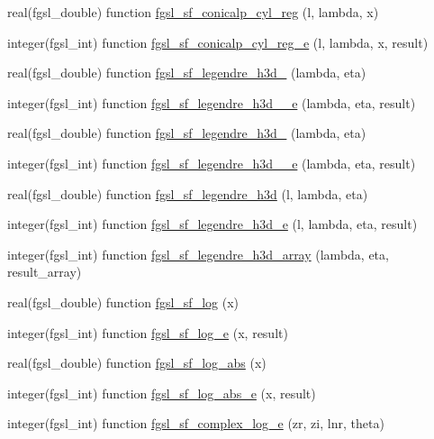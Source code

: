 \begin{DoxyCompactItemize}
real(fgsl\+\_\+double) function \hyperlink{specfunc_8finc_ac8ee55b9021c5e2c23b744765bddb373}{fgsl\+\_\+sf\+\_\+conicalp\+\_\+cyl\+\_\+reg} (l, lambda, x)
\item 
integer(fgsl\+\_\+int) function \hyperlink{specfunc_8finc_a0a2e0199a0c50c50090791c959dbf7c5}{fgsl\+\_\+sf\+\_\+conicalp\+\_\+cyl\+\_\+reg\+\_\+e} (l, lambda, x, result)
\item 
real(fgsl\+\_\+double) function \hyperlink{specfunc_8finc_ab5903aacdd1a2d46b70c67ab2ad7816a}{fgsl\+\_\+sf\+\_\+legendre\+\_\+h3d\+\_} (lambda, eta)
\item 
integer(fgsl\+\_\+int) function \hyperlink{specfunc_8finc_adffa978971a6881eb6f8cb7d7a718c58}{fgsl\+\_\+sf\+\_\+legendre\+\_\+h3d\+\_\+\_\+e} (lambda, eta, result)
\item 
real(fgsl\+\_\+double) function \hyperlink{specfunc_8finc_aeb960c0b1e2393677a18642e723de91e}{fgsl\+\_\+sf\+\_\+legendre\+\_\+h3d\+\_} (lambda, eta)
\item 
integer(fgsl\+\_\+int) function \hyperlink{specfunc_8finc_acd96c1b247f9feb26a6aba0f155fc826}{fgsl\+\_\+sf\+\_\+legendre\+\_\+h3d\+\_\+\_\+e} (lambda, eta, result)
\item 
real(fgsl\+\_\+double) function \hyperlink{specfunc_8finc_a49522d27cea17494b3b8037627f6590f}{fgsl\+\_\+sf\+\_\+legendre\+\_\+h3d} (l, lambda, eta)
\item 
integer(fgsl\+\_\+int) function \hyperlink{specfunc_8finc_aee989feed5b2b9559c15fda0f82a6ce0}{fgsl\+\_\+sf\+\_\+legendre\+\_\+h3d\+\_\+e} (l, lambda, eta, result)
\item 
integer(fgsl\+\_\+int) function \hyperlink{specfunc_8finc_aefc2599c7fd476aacc176d47774826ee}{fgsl\+\_\+sf\+\_\+legendre\+\_\+h3d\+\_\+array} (lambda, eta, result\+\_\+array)
\item 
real(fgsl\+\_\+double) function \hyperlink{specfunc_8finc_a11c53d41419d49626362b644dff29fe4}{fgsl\+\_\+sf\+\_\+log} (x)
\item 
integer(fgsl\+\_\+int) function \hyperlink{specfunc_8finc_acba32e298535b22e43bec80c9964e3c1}{fgsl\+\_\+sf\+\_\+log\+\_\+e} (x, result)
\item 
real(fgsl\+\_\+double) function \hyperlink{specfunc_8finc_a0f6de609e56b2190101659007e284343}{fgsl\+\_\+sf\+\_\+log\+\_\+abs} (x)
\item 
integer(fgsl\+\_\+int) function \hyperlink{specfunc_8finc_adb97222a064d07be2bf6df44f4d8121b}{fgsl\+\_\+sf\+\_\+log\+\_\+abs\+\_\+e} (x, result)
\item 
integer(fgsl\+\_\+int) function \hyperlink{specfunc_8finc_af917d4b6a5658b1827d0485e5f3b62d8}{fgsl\+\_\+sf\+\_\+complex\+\_\+log\+\_\+e} (zr, zi, lnr, theta)

\end{DoxyCompactItemize}
